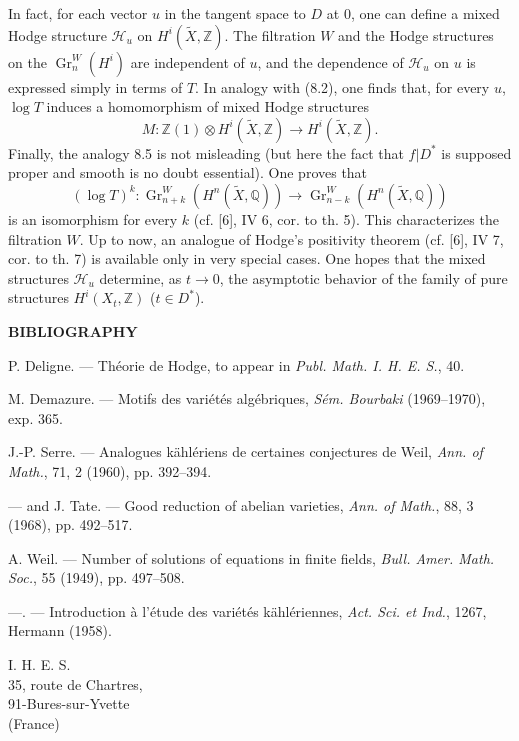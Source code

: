 \documentclass[10pt]{article}
\newcommand{\Q}{\mathbb Q}
\newcommand{\Z}{\mathbb Z}
\newcommand{\Gr}{\operatorname{Gr}}
\newcommand{\wt}{\widetilde}
\newcommand{\calH}{\mathcal H}
\begin{document}
In fact, for each vector $u$ in the tangent space to $D$ at $0$, one can define a mixed Hodge structure $\calH_u$ on $H^i(\wt X,\Z)$. The filtration $W$ and the Hodge structures on the $\Gr_n^W(H^i)$ are independent of $u$, and the dependence of $\calH_u$ on $u$ is expressed simply in terms of $T$. In analogy with (8.2), one finds that, for every $u$, $\log T$ induces a homomorphism of mixed Hodge structures
\[
M:\Z(1)\otimes H^i(\wt X,\Z)\longrightarrow H^i(\wt X,\Z).
\]
Finally, the analogy 8.5 is not misleading (but here the fact that $f|D^*$ is supposed proper and smooth is no doubt essential). One proves that
\[
(\log T)^k:\Gr_{n+k}^W(H^n(\wt X,\Q))\longrightarrow\Gr_{n-k}^W(H^n(\wt X,\Q))
\]
is an isomorphism for every $k$ (cf. [6], IV 6, cor. to th. 5). This characterizes the filtration $W$. Up to now, an analogue of Hodge's positivity theorem (cf. [6], IV 7, cor. to th. 7) is available only in very special cases. One hopes that the mixed structures $\calH_u$ determine, as $t\to0$, the asymptotic behavior of the family of pure structures $H^i(X_t,\Z)$ ($t\in D^*$).

\begin{center}
\bfseries BIBLIOGRAPHY
\end{center}
\begin{enumerate}[label={[\arabic*]},leftmargin=2.2em,itemsep=0.1em]
\item P. Deligne. — Théorie de Hodge, to appear in \emph{Publ. Math. I. H. E. S.}, 40.
\item M. Demazure. — Motifs des variétés algébriques, \emph{Sém. Bourbaki} (1969--1970), exp. 365.
\item J.-P. Serre. — Analogues kählériens de certaines conjectures de Weil, \emph{Ann. of Math.}, 71, 2 (1960), pp. 392--394.
\item — and J. Tate. — Good reduction of abelian varieties, \emph{Ann. of Math.}, 88, 3 (1968), pp. 492--517.
\item A. Weil. — Number of solutions of equations in finite fields, \emph{Bull. Amer. Math. Soc.}, 55 (1949), pp. 497--508.
\item —. — Introduction à l'étude des variétés kählériennes, \emph{Act. Sci. et Ind.}, 1267, Hermann (1958).
\end{enumerate}

\begin{flushleft}
I. H. E. S.\\
35, route de Chartres,\\
91-Bures-sur-Yvette\\
(France)
\end{flushleft}
\end{document}

